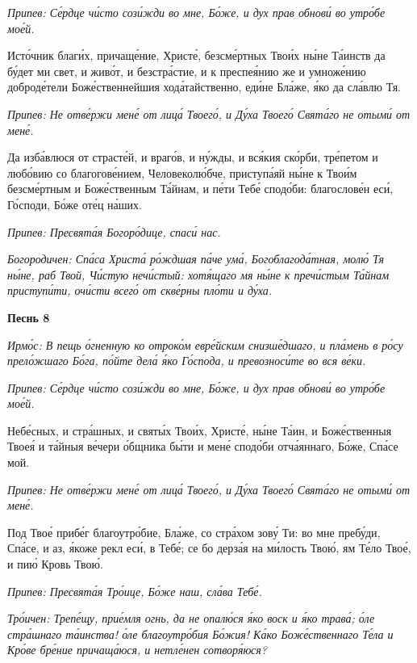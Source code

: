  \itshape Припев:\normalfont{} Се́рдце чи́сто сози́жди во мне, Бо́же, и дух прав обнови́ во утро́бе
мое́й.


   Исто́чник благи́х, причаще́ние, Христе́, безсме́ртных Твои́х ны́не Та́инств
да бу́дет ми свет, и живо́т, и безстра́стие, и к преспея́нию же и умноже́нию
доброде́тели Боже́ственнейшия хода́тайственно, еди́не Бла́же, я́ко да сла́влю
Тя.


 \itshape Припев:\normalfont{} Не отве́ржи мене́ от лица́ Твоего́, и Ду́ха Твоего́ Свята́го не отыми́ от
мене́.


   Да изба́влюся от страсте́й, и враго́в, и ну́жды, и вся́кия ско́рби, тре́петом
и любо́вию со благогове́нием, Человеколю́бче, приступа́яй ны́не к Твои́м
безсме́ртным и Боже́ственным Та́йнам, и пе́ти Тебе́ сподо́би: благослове́н еси́,
Го́споди, Бо́же оте́ц на́ших.


 \itshape Припев:\normalfont{} Пресвята́я Богоро́дице, спаси́ нас.


 \itshape Богородичен:\normalfont{} Спа́са Христа́ ро́ждшая па́че ума́, Богоблагода́тная,
молю́ Тя ны́не, раб Твой, Чи́стую нечи́стый: хотя́щаго мя ны́не к
пречи́стым Та́йнам приступи́ти, очи́сти всего́ от скве́рны пло́ти и
ду́ха.



 

\bfseries Песнь 8\normalfont{}


 \itshape Ирмо́с:\normalfont{} В пещь о́гненную ко отроко́м евре́йским снизше́дшаго, и пла́мень в
ро́су прело́жшаго Бо́га, по́йте дела́ я́ко Го́спода, и превозноси́те во вся
ве́ки.


 \itshape Припев:\normalfont{} Се́рдце чи́сто сози́жди во мне, Бо́же, и дух прав обнови́ во утро́бе
мое́й.


   Небе́сных, и стра́шных, и святы́х Твои́х, Христе́, ны́не Та́ин, и
Боже́ственныя Твоея́ и та́йныя ве́чери о́бщника бы́ти и мене́ сподо́би
отча́яннаго, Бо́же, Спа́се мой.


 \itshape Припев:\normalfont{} Не отве́ржи мене́ от лица́ Твоего́, и Ду́ха Твоего́ Свята́го не отыми́ от
мене́.


   Под Твое́ прибе́г благоутро́бие, Бла́же, со стра́хом зову́ Ти: во мне
пребу́ди, Спа́се, и аз, я́коже рекл еси́, в Тебе́; се бо дерза́я на ми́лость Твою́,
ям Те́ло Твое́, и пию́ Кровь Твою́.


 \itshape Припев:\normalfont{} Пресвята́я Тро́ице, Бо́же наш, сла́ва Тебе́.


 \itshape Тро́ичен:\normalfont{} Трепе́щу, прие́мля огнь, да не опалю́ся я́ко воск и я́ко трава́; о́ле
стра́шнаго та́инства! о́ле благоутро́бия Бо́жия! Ка́ко Боже́ственнаго Те́ла и
Кро́ве бре́ние причаща́юся, и нетле́нен сотворя́юся?



